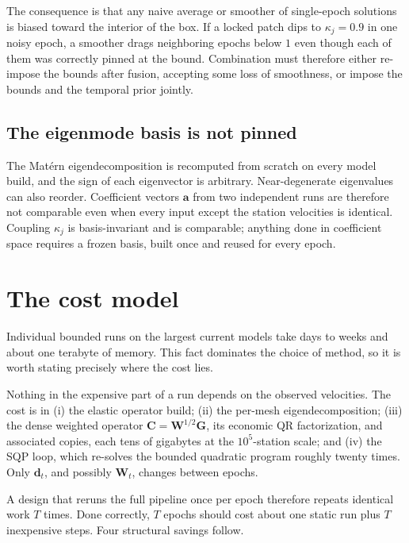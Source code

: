 \documentclass[11pt]{article}
\newcommand{\vect}[1]{\bm{#1}}
\newcommand{\mat}[1]{\mathbf{#1}}
\begin{document}
The consequence is that any naive average or smoother of single-epoch solutions is biased toward the interior of the box. If a locked patch dips to $\kappa_j = 0.9$ in one noisy epoch, a smoother drags neighboring epochs below $1$ even though each of them was correctly pinned at the bound. Combination must therefore either re-impose the bounds after fusion, accepting some loss of smoothness, or impose the bounds and the temporal prior jointly.

\subsection{The eigenmode basis is not pinned}

The Mat\'ern eigendecomposition is recomputed from scratch on every model build, and the sign of each eigenvector is arbitrary. Near-degenerate eigenvalues can also reorder. Coefficient vectors $\vect{a}$ from two independent runs are therefore not comparable even when every input except the station velocities is identical. Coupling $\kappa_j$ is basis-invariant and is comparable; anything done in coefficient space requires a frozen basis, built once and reused for every epoch.

\section{The cost model}
\label{sec:cost}

Individual bounded runs on the largest current models take days to weeks and about one terabyte of memory. This fact dominates the choice of method, so it is worth stating precisely where the cost lies.

Nothing in the expensive part of a run depends on the observed velocities. The cost is in (i) the elastic operator build; (ii) the per-mesh eigendecomposition; (iii) the dense weighted operator $\mat{C} = \mat{W}^{1/2}\mat{G}$, its economic QR factorization, and associated copies, each tens of gigabytes at the $10^5$-station scale; and (iv) the SQP loop, which re-solves the bounded quadratic program roughly twenty times. Only $\vect{d}_t$, and possibly $\mat{W}_t$, changes between epochs.

A design that reruns the full pipeline once per epoch therefore repeats identical work $T$ times. Done correctly, $T$ epochs should cost about one static run plus $T$ inexpensive steps. Four structural savings follow.
\end{document}
